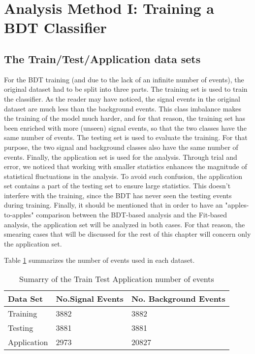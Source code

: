 \section{Analysis Method I: Training a BDT Classifier}
\label{sec:org2ab78e2}
\label{sec:Analysis_method1}
\subsection{The Train/Test/Application data sets}
\label{sec:orgdba9d84}
\label{sec:Train_test_application_sets}
For the BDT training (and due to the lack of an infinite number of events), the original dataset had to be split into three parts. The training set is used to train the classifier. As the reader may have noticed, the signal events in the original dataset are much less than the background events. This class imbalance makes the training of the model much harder, and for that reason, the training set has been enriched with more (unseen) signal events, so that the two classes have the same number of events. The testing set is used to evaluate the training. For that purpose, the two signal and background classes also have the same number of events. Finally, the application set is used for the analysis. Through trial and error, we noticed that working with smaller statistics enhances the magnitude of statistical fluctuations in the analysis. To avoid such confusion, the application set contains a part of the testing set to ensure large statistics. This doesn't interfere with the training, since the BDT has never seen the testing events during training. Finally, it should be mentioned that in order to have an "apples-to-apples" comparison between the BDT-based analysis and the Fit-based analysis, the application set will be analyzed in both cases. For that reason, the smearing cases that will be discussed for the rest of this chapter will concern only the application set.

Table \ref{table:TrainTestApp} summarizes the number of events used in each dataset.

\begin{table}[h!]
\centering
\begin{tabular}{ |p{3cm}|p{3cm}|p{4cm}|  }
 \hline
Data Set & No.Signal Events & No. Background Events \\
 \hline
Training & 3882 & 3882 \\
Testing & 3881 & 3881 \\
Application & 2973 & 20827 \\
 \hline
\end{tabular}
\caption{Sumarry of the Train Test Application number of events}
\label{table:TrainTestApp}
\end{table}
